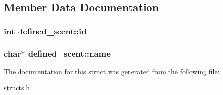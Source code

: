 \subsection{Member Data Documentation}
\hypertarget{structdefined__scent_a06377aa498a4e08e88780482a5526298}{
\subsubsection[{id}]{\setlength{\rightskip}{0pt plus 5cm}int defined\-\_\-scent\-::id}}\label{structdefined__scent_a06377aa498a4e08e88780482a5526298}
\hypertarget{structdefined__scent_a519a9186d8f7e23334c40702ad6e3bb0}{
\subsubsection[{name}]{\setlength{\rightskip}{0pt plus 5cm}char$\ast$ defined\-\_\-scent\-::name}}\label{structdefined__scent_a519a9186d8f7e23334c40702ad6e3bb0}


The documentation for this struct was generated from the following file\-:\begin{DoxyCompactItemize}
\item 
\hyperlink{structs_8h}{structs.\-h}\end{DoxyCompactItemize}
